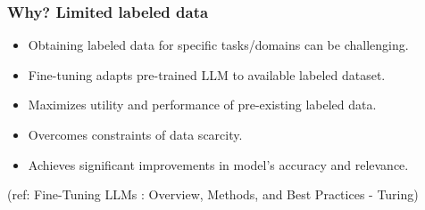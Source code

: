 \begin{frame}[fragile]\frametitle{Why? Limited labeled data}

  \begin{itemize}
    \item Obtaining labeled data for specific tasks/domains can be challenging.
    \item Fine-tuning adapts pre-trained LLM to available labeled dataset.
    \item Maximizes utility and performance of pre-existing labeled data.
    \item Overcomes constraints of data scarcity.
    \item Achieves significant improvements in model's accuracy and relevance.
  \end{itemize}
  
  {\tiny (ref: Fine-Tuning LLMs : Overview, Methods, and Best Practices - Turing)}
  
\end{frame}



